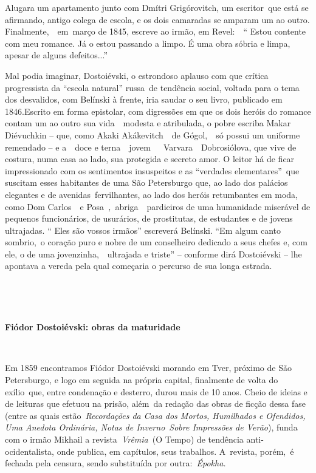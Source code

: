Alugara um apartamento junto com Dmítri Grigórovitch, um escritor~que
está se afirmando, antigo colega de escola, e os dois camaradas se
amparam um ao outro. Finalmente,~~em~março de 1845, escreve ao irmão, em
Revel:~~`` Estou contente com meu romance. Já o estou passando a limpo.
É uma obra sóbria e limpa, apesar de alguns defeitos...''

Mal podia imaginar, Dostoiévski, o estrondoso aplauso com que crítica
progressista da ``escola natural'' russa~de tendência social, voltada
para o tema dos desvalidos, com Belínski à frente, iria saudar o seu
livro, publicado em 1846.Escrito em forma epistolar, com digressões em
que os dois heróis do romance contam um ao outro sua vida~~modesta e
atribulada, o pobre escriba Makar Diévuchkin -- que, como Akaki
Akákevitch~~de Gógol,~~só possui um uniforme remendado -- e a~~doce e
terna~~jovem~~~Varvara~~Dobrosiólova, que vive de costura, numa casa ao
lado, sua protegida e secreto amor. O leitor há de ficar impressionado
com os sentimentos insuspeitos e as ``verdades elementares''~que
suscitam esses habitantes de uma São Petersburgo que, ao lado dos
palácios elegantes e de avenidas~fervilhantes, ao lado dos heróis
retumbantes em moda, como Dom Carlos~~e Posa~\emph{,}~abriga~~pardieiros
de uma humanidade miserável de pequenos funcionários, de usurários, de
prostitutas, de estudantes e de jovens ultrajadas. `` Eles são vossos
irmãos'' escreverá Belínski. ``Em algum canto sombrio,~o coração puro e
nobre de um conselheiro dedicado a seus chefes e, com ele, o de uma
jovenzinha,~~ultrajada e triste'' -- conforme dirá Dostoiévski -- lhe
apontava a vereda pela qual começaria o percurso de sua longa estrada.

~

~

\textbf{Fiódor Dostoiévski: obras da maturidade}

~

Em 1859 encontramos Fiódor Dostoiévski morando em Tver, próximo de São
Petersburgo, e logo em seguida na própria capital, finalmente de volta
do exílio~que, entre condenação e desterro, durou mais de 10 anos. Cheio
de ideias e de leituras que efetuou na prisão, além~da redação das obras
de ficção dessa fase (entre as quais estão~\emph{Recordações da Casa dos
Mortos, Humilhados e Ofendidos, Uma Anedota Ordinária, Notas de
Inverno}~\emph{Sobre Impressões de Verão}), funda com o irmão Mikhail a
revista~\emph{Vrêmia}~(O Tempo) de tendência anti-ocidentalista, onde
publica, em capítulos, seus trabalhos. A~revista, porém,~é fechada pela
censura, sendo substituída por outra:~\emph{Épokha.}

